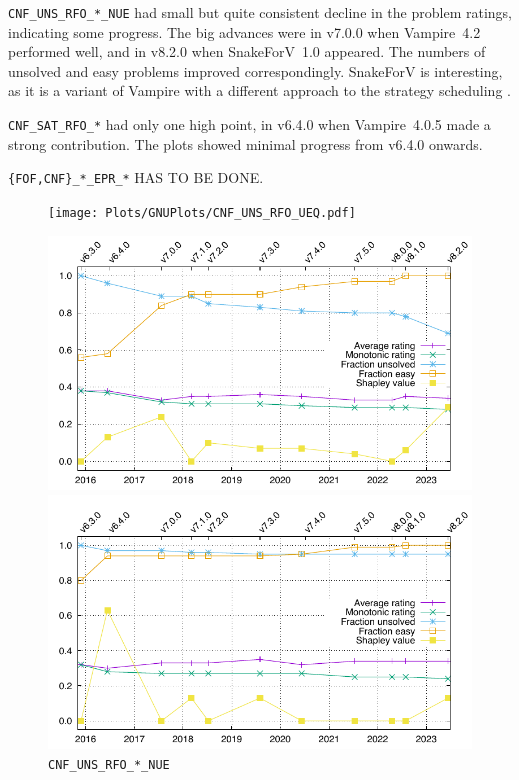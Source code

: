 \documentclass[runningheads]{llncs}
\begin{document}
{\tt CNF\_UNS\_RFO\_*\_NUE} had small but quite consistent decline in the problem ratings, 
indicating some progress.
The big advances were in v7.0.0 when Vampire~4.2 performed well, and in v8.2.0 when SnakeForV~1.0
appeared.
The numbers of unsolved and easy problems improved correspondingly.
SnakeForV is interesting, as it is a variant of Vampire with a different approach to the strategy
scheduling \cite{Sud22}.

{\tt CNF\_SAT\_RFO\_*} had only one high point, in v6.4.0 when Vampire~4.0.5 made a strong
contribution.
The plots showed minimal progress from v6.4.0 onwards.

{\tt \{FOF,CNF\}\_*\_EPR\_*} HAS TO BE DONE.

\begin{figure}[h!]
\centering
\begin{minipage}[t]{.49\textwidth}
  \centering
  \texttt{[image: Plots/GNUPlots/CNF\_UNS\_RFO\_UEQ.pdf]}
  \vspace*{-2em}
  \caption{{\tt CNF\_UNS\_RFO\_PEQ\_UEQ}}
  \label{Plot_CNF_UEQ}
\end{minipage}
\begin{minipage}[t]{.49\textwidth}
  \centering
  \includegraphics[width=\textwidth]{Plots/GNUPlots/CNF_UNS_RFO_NUE.pdf}
  \vspace*{-2em}
  \caption{{\tt CNF\_UNS\_RFO\_*\_NUE}}
  \label{Plot_CNF_UNS}
\end{minipage}
\begin{minipage}[t]{.49\textwidth}
  \centering
  \includegraphics[width=\textwidth]{Plots/GNUPlots/CNF_SAT_RFO.pdf}

\end{minipage}
\end{figure}
\end{document}
